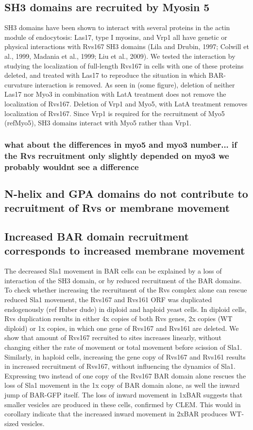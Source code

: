 \documentclass[9pt,lineno]{elife}
\begin{document}
\subsection{SH3 domains are recruited by Myosin 5}
SH3 domains have been shown to interact with several proteins in the actin module of endocytosis: Las17, type I myosins, and Vrp1 all have genetic or physical interactions with Rvs167 SH3 domains (Lila and Drubin, 1997; Colwill et al., 1999, Madania et al., 1999; Liu et al., 2009). 
We tested the interaction by studying the localization of full-length Rvs167 in cells with one of these proteins deleted, and treated with Las17 to reproduce the situation in which BAR-curvature interaction is removed. 
As seen in (some figure), deletion of neither Las17 nor Myo3 in combination with LatA treatment does not remove the localization of Rvs167. Deletion of Vrp1 and Myo5, with LatA treatment removes localization of Rvs167. Since Vrp1 is required for the recruitment of Myo5 (refMyo5), SH3 domains interact with Myo5 rather than Vrp1. 
\subsubsection{\color{red} 
	what about the differences in myo5 and myo3 number... if the Rvs recruitment only slightly depended on myo3 we probably wouldnt see a difference
}

\subsection{N-helix and GPA domains do not contribute to recruitment of Rvs or membrane movement}
\lipsum[12]
	
\subsection{Increased BAR domain recruitment corresponds to increased membrane movement}
The decreased Sla1 movement in BAR cells can be explained by a loss of interaction of the SH3 domain, or by reduced recruitment of the  BAR domains. To check whether increasing the recruitment of the Rvs complex alone can rescue reduced Sla1 movement, the Rvs167 and Rvs161 ORF was duplicated endogenously (ref Huber dude) in diploid and haploid yeast cells. In diploid cells, Rvs duplication results in either 4x copies of both Rvs genes, 2x copies (WT diploid) or 1x copies, in which one gene of Rvs167 and Rvs161 are deleted. We show that amount of Rvs167 recruited to sites increases linearly, without changing either the rate of movement or total movement before scission of Sla1. 
Similarly, in haploid cells, increasing the gene copy of Rvs167 and Rvs161 results in increased recruitment of Rvs167, without influencing the dynamics of Sla1. Expressing two instead of one copy of the Rvs167 BAR domain alone rescues the loss of Sla1 movement in the 1x copy of BAR domain alone, as well the inward jump of BAR-GFP itself. The loss of inward movement in 1xBAR suggests that smaller vesicles are produced in these cells, confirmed by CLEM. This would in corollary indicate that the increased inward movement in 2xBAR produces WT-sized vesicles. 
\end{document}
